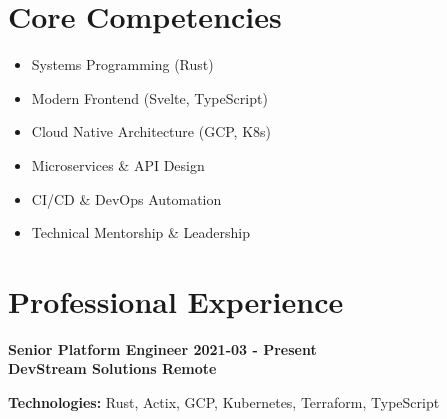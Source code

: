 \documentclass[11pt,letterpaper]{article}
\begin{document}
\section{Core Competencies}
\begin{itemize}[label=\textbullet]
    
        \item Systems Programming (Rust)
    
        \item Modern Frontend (Svelte, TypeScript)
    
        \item Cloud Native Architecture (GCP, K8s)
    
        \item Microservices \& API Design
    
        \item CI/CD \& DevOps Automation
    
        \item Technical Mentorship \& Leadership
    
\end{itemize}



\section{Professional Experience}

    \color{sectioncolor}
    \textbf{
        Senior Platform Engineer
        \hfill
        2021-03 - Present \\
        DevStream Solutions
        \hfill
        Remote \\
    }

    \color{textcolor}
    \vspace{2pt}
    
        {\footnotesize\color{accentcolor}\textbf{Technologies:} Rust, Actix, GCP, Kubernetes, Terraform, TypeScript } \\
    
    
    
\end{document}
